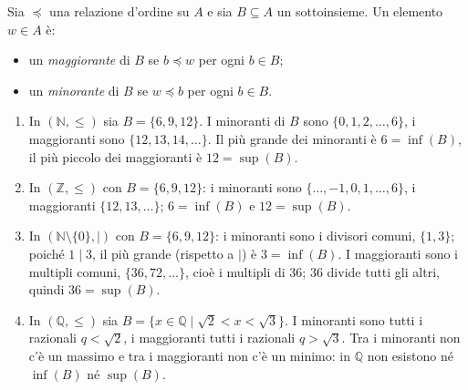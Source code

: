 \documentclass[11pt,a4paper]{article}
\begin{document}
\begin{definizione}
Sia $\preceq$ una relazione d'ordine su $A$ e sia $B \subseteq A$ un
sottoinsieme. Un elemento $w \in A$ è:
\begin{itemize}
    \item un \emph{maggiorante} di $B$ se $b \preceq w$ per ogni
          $b \in B$;
    \item un \emph{minorante} di $B$ se $w \preceq b$ per ogni $b \in B$.
\end{itemize}
\end{definizione}

\begin{esempio}
\leavevmode
\begin{enumerate}
    \item In $(\mathbb{N}, \leq)$ sia $B = \{6, 9, 12\}$.
          I minoranti di $B$ sono $\{0, 1, 2, \dots, 6\}$, i maggioranti
          sono $\{12, 13, 14, \dots\}$. Il più grande dei minoranti è
          $6 = \inf(B)$, il più piccolo dei maggioranti è
          $12 = \sup(B)$.

    \item In $(\mathbb{Z}, \leq)$ con $B = \{6,\allowbreak 9,\allowbreak 12\}$: i minoranti sono
          $\{\dots,\allowbreak -1,\allowbreak 0,\allowbreak 1,\allowbreak \dots,\allowbreak 6\}$, i maggioranti
          $\{12,\allowbreak 13,\allowbreak \dots\}$; $6 = \inf(B)$ e $12 = \sup(B)$.

    \item In $(\mathbb{N} \setminus \{0\}, \mid)$ con $B = \{6, 9, 12\}$:
          i minoranti sono i divisori comuni, $\{1, 3\}$; poiché $1 \mid 3$,
          il più grande (rispetto a $\mid$) è $3 = \inf(B)$. I maggioranti
          sono i multipli comuni, $\{36, 72, \dots\}$, cioè i multipli di
          $36$; $36$ divide tutti gli altri, quindi $36 = \sup(B)$.

    \item In $(\mathbb{Q}, \leq)$ sia
          $B = \{x \in \mathbb{Q} \mid \sqrt{2} < x < \sqrt{3}\}$.
          I minoranti sono tutti i razionali $q < \sqrt{2}$, i maggioranti
          tutti i razionali $q > \sqrt{3}$. Tra i minoranti non c'è un
          massimo e tra i maggioranti non c'è un minimo: in $\mathbb{Q}$
          non esistono né $\inf(B)$ né $\sup(B)$.
\end{enumerate}
\end{esempio}
\end{document}
